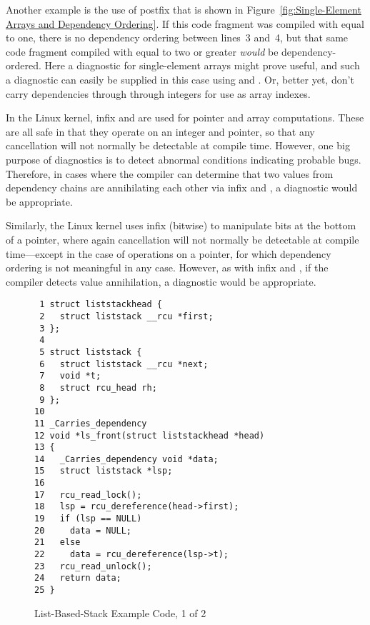 \documentclass[letterpaper,twocolumn,10pt]{article}
\begin{document}
Another example is the use of postfix \co{[]} that is shown in
Figure~\ref{fig:Single-Element Arrays and Dependency Ordering}.
If this code fragment was compiled with  equal to
one, there is no dependency ordering between lines~3 and~4,
but that same code fragment compiled with  equal to
two or greater \emph{would} be dependency-ordered.
Here a diagnostic for single-element arrays might prove useful,
and such a diagnostic can easily be supplied in this case using 
and .
Or, better yet, don't carry dependencies through through integers
for use as array indexes.

In the Linux kernel, infix \co{+} and \co{-} are used for pointer
and array computations.
These are all safe in that they operate on an integer and pointer, so
that any cancellation will not normally be detectable at compile time.
However, one big purpose of diagnostics is to detect abnormal conditions
indicating probable bugs.
Therefore, in cases where the compiler can determine that two values
from dependency chains are annihilating each other via
infix \co{+} and \co{-}, a diagnostic would be appropriate.

Similarly, the Linux kernel uses infix (bitwise) \co{&} to manipulate
bits at the bottom of a pointer, where again cancellation will not
normally be detectable at compile time---except in the case of operations
on a  pointer, for which dependency ordering is not meaningful
in any case.
However, as with infix \co{+} and \co{-}, if the compiler detects
value annihilation, a diagnostic would be appropriate.

\begin{figure}[tbp]
{ \scriptsize
\begin{verbatim}
 1 struct liststackhead {
 2   struct liststack __rcu *first;
 3 };
 4 
 5 struct liststack {
 6   struct liststack __rcu *next;
 7   void *t;
 8   struct rcu_head rh;
 9 };
10 
11 _Carries_dependency
12 void *ls_front(struct liststackhead *head)
13 {
14   _Carries_dependency void *data;
15   struct liststack *lsp;
16 
17   rcu_read_lock();
18   lsp = rcu_dereference(head->first);
19   if (lsp == NULL)
20     data = NULL;
21   else
22     data = rcu_dereference(lsp->t);
23   rcu_read_unlock();
24   return data;
25 }
\end{verbatim}
}
\caption{List-Based-Stack Example Code, 1 of 2}
\label{fig:List-Based-Stack Example Code, 1 of 2}
\end{figure}
\end{document}
